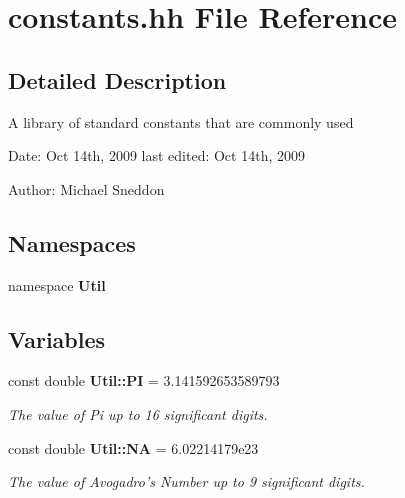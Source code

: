 \section{constants.hh File Reference}
\label{constants_8hh}


\subsection{Detailed Description}
A library of standard constants that are commonly used

\begin{Desc}
\item[Date:]Oct 14th, 2009 last edited: Oct 14th, 2009\end{Desc}
\begin{Desc}
\item[Author:]Michael Sneddon \end{Desc}


\subsection*{Namespaces}
\begin{CompactItemize}
\item 
namespace {\bf Util}
\end{CompactItemize}
\subsection*{Variables}
\begin{CompactItemize}
\item 
const double {\bf Util::PI} = 3.141592653589793
\begin{CompactList}\small\item\em The value of Pi up to 16 significant digits. \item\end{CompactList}\item 
const double {\bf Util::NA} = 6.02214179e23
\begin{CompactList}\small\item\em The value of Avogadro's Number up to 9 significant digits. \item\end{CompactList}\end{CompactItemize}

